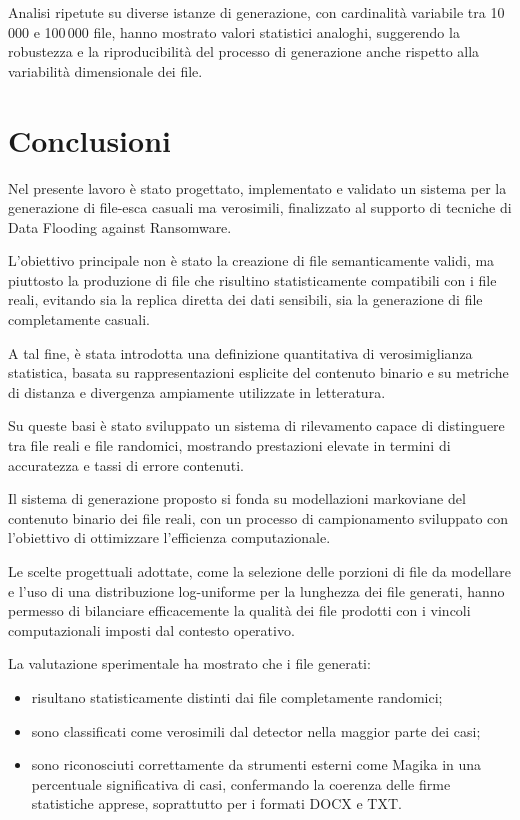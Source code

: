 \documentclass{report}
\begin{document}
\bigskip

Analisi ripetute su diverse istanze di generazione, con cardinalità variabile tra
10\,000 e 100\,000 file, hanno mostrato valori statistici analoghi, suggerendo la
robustezza e la riproducibilità del processo di generazione anche rispetto alla
variabilità dimensionale dei file.




\chapter{Conclusioni}

Nel presente lavoro è stato progettato, implementato e validato un sistema per la generazione
di file-esca casuali ma verosimili, finalizzato al supporto di tecniche di Data Flooding against Ransomware.

L'obiettivo principale non è stato la creazione di file semanticamente validi, ma piuttosto la produzione di file
che risultino statisticamente compatibili con i file reali, evitando sia la replica diretta dei dati sensibili,
sia la generazione di file completamente casuali.

\bigskip

A tal fine, è stata introdotta una definizione quantitativa di verosimiglianza statistica, basata su 
rappresentazioni esplicite del contenuto binario e su metriche di distanza e divergenza ampiamente utilizzate
in letteratura.

Su queste basi è stato sviluppato un sistema di rilevamento capace di distinguere tra file reali e file randomici,
mostrando prestazioni elevate in termini di accuratezza e tassi di errore contenuti.


\bigskip

Il sistema di generazione proposto si fonda su modellazioni markoviane del contenuto binario dei file reali,
con un processo di campionamento sviluppato con l'obiettivo di ottimizzare l'efficienza computazionale.

Le scelte progettuali adottate, come la selezione delle porzioni di file da modellare e
l'uso di una distribuzione log-uniforme per la lunghezza dei file generati,
hanno permesso di bilanciare efficacemente la qualità dei file prodotti
con i vincoli computazionali imposti dal contesto operativo.

\bigskip

La valutazione sperimentale ha mostrato che i file generati:
\begin{itemize}
    \item risultano statisticamente distinti dai file completamente randomici;
    \item sono classificati come verosimili dal detector nella maggior parte dei casi;
    \item sono riconosciuti correttamente da strumenti esterni come Magika in una percentuale significativa di casi,
          confermando la coerenza delle firme statistiche apprese, soprattutto per i formati DOCX e TXT.
\end{itemize}
\end{document}
